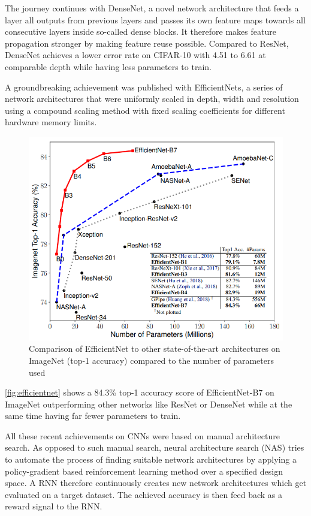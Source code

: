 The journey continues with DenseNet, a novel network architecture that feeds a layer all outputs from previous layers and passes its own feature maps towards all consecutive layers inside so-called dense blocks. It therefore makes feature propagation stronger by making feature reuse possible. Compared to ResNet, DenseNet achieves a lower error rate on CIFAR-10 with 4.51 to 6.61 at comparable depth while having less parameters to train. \cite{GaoHuang.2016}

A groundbreaking achievement was published with EfficientNets, a series of network architectures that were uniformly scaled in depth, width and resolution using a compound scaling method with fixed scaling coefficients for different hardware memory limits. 

\begin{figure}[t]
	\begin{center}
		\includegraphics[width=0.8\linewidth]{images/efficientnet.PNG}
	\end{center}
	\caption{Comparison of EfficientNet to other state-of-the-art architectures on ImageNet (top-1 accuracy) compared to the number of parameters used}
	\label{fig:efficientnet}
\end{figure}

\autoref{fig:efficientnet} shows a 84.3\% top-1 accuracy score of EfficientNet-B7 on ImageNet outperforming other networks like ResNet or DenseNet while at the same time having far fewer parameters to train. \cite{LeMingxingTan.2019}

All these recent achievements on CNNs were based on manual architecture search. As opposed to such manual search, neural architecture search (NAS) tries to automate the process of finding suitable network architectures by applying a policy-gradient based reinforcement learning method over a specified design space. A RNN therefore continuously creates new network architectures which get evaluated on a target dataset. The achieved accuracy is then feed back as a reward signal to the RNN. \cite{LeBarretZoph.2017}

